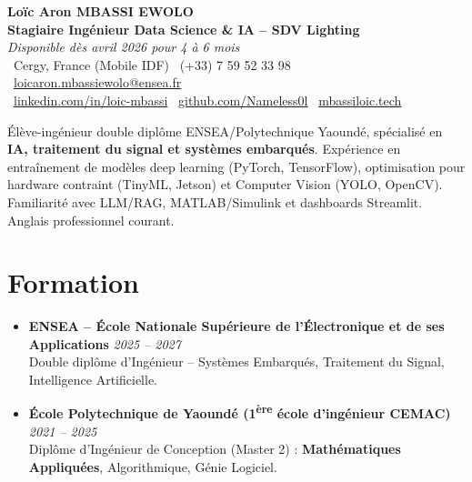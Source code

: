 \documentclass[a4paper,11pt]{article}
\begin{document}
\begin{center}
    {\Large \textbf{Loïc Aron MBASSI EWOLO}} \\ \vspace{4pt}
    \textbf{\large Stagiaire Ingénieur Data Science \& IA -- SDV Lighting} \\
    \textit{\small Disponible dès avril 2026 pour 4 à 6 mois} \\ \vspace{4pt}
    \small
    \faMapMarker\ Cergy, France (Mobile IDF) \quad
    \faPhone\ (+33) 7 59 52 33 98 \quad
    \faEnvelope\ \href{mailto:loicaron.mbassiewolo@ensea.fr}{loicaron.mbassiewolo@ensea.fr} \\ \vspace{2pt}
    \faLinkedin\ \href{https://www.linkedin.com/in/loic-mbassi/}{linkedin.com/in/loic-mbassi} \quad
    \faGithub\ \href{https://github.com/Nameless0l}{github.com/Nameless0l} \quad
    \faGlobe\ \href{https://mbassiloic.tech}{mbassiloic.tech}
\end{center}

\vspace{-6pt}

\noindent\small{Élève-ingénieur double diplôme ENSEA/Polytechnique Yaoundé, spécialisé en \textbf{IA, traitement du signal et systèmes embarqués}. Expérience en entraînement de modèles deep learning (PyTorch, TensorFlow), optimisation pour hardware contraint (TinyML, Jetson) et Computer Vision (YOLO, OpenCV). Familiarité avec LLM/RAG, MATLAB/Simulink et dashboards Streamlit. Anglais professionnel courant.}

\section{Formation}
\begin{itemize}[leftmargin=*, label=\tiny$\bullet$, nosep]
    \item \textbf{ENSEA -- École Nationale Supérieure de l'Électronique et de ses Applications} \hfill \textit{2025 -- 2027} \\
    \small{Double diplôme d'Ingénieur -- Systèmes Embarqués, Traitement du Signal, Intelligence Artificielle.}
    \item \textbf{École Polytechnique de Yaoundé (1\textsuperscript{ère} école d'ingénieur CEMAC)} \hfill \textit{2021 -- 2025} \\
    \small{Diplôme d'Ingénieur de Conception (Master 2) : \textbf{Mathématiques Appliquées}, Algorithmique, Génie Logiciel.}
\end{itemize}
\end{document}
